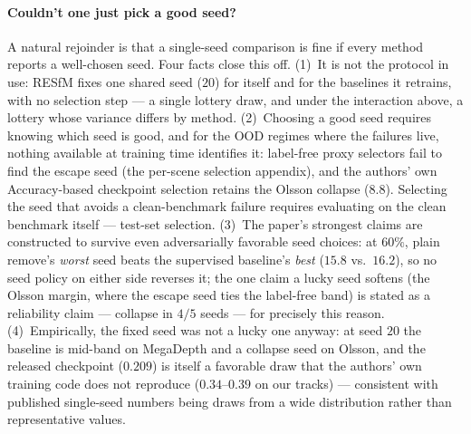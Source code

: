 \documentclass[10pt,twocolumn,letterpaper]{article}
\begin{document}
\paragraph{Couldn't one just pick a good seed?} A natural rejoinder is that a
single-seed comparison is fine if every method reports a well-chosen seed. Four facts
close this off. (1)~It is not the protocol in use: RESfM fixes one shared seed ($20$)
for itself and for the baselines it retrains, with no selection step --- a single
lottery draw, and under the interaction above, a lottery whose variance differs by
method. (2)~Choosing a good seed requires knowing which seed is good, and for the OOD
regimes where the failures live, nothing available at training time identifies it:
label-free proxy selectors fail to find the escape seed (the per-scene selection appendix), and
the authors' own Accuracy-based checkpoint selection retains the Olsson collapse
($8.8$). Selecting the seed that avoids a clean-benchmark failure requires evaluating
on the clean benchmark itself --- test-set selection. (3)~The paper's strongest claims
are constructed to survive even adversarially favorable seed choices: at $60\%$, plain
remove's \emph{worst} seed beats the supervised baseline's \emph{best} ($15.8$ vs.\
$16.2$), so no seed policy on either side reverses it; the one claim a lucky seed
softens (the Olsson margin, where the escape seed ties the label-free band) is stated
as a reliability claim --- collapse in $4/5$ seeds --- for precisely this reason.
(4)~Empirically, the fixed seed was not a lucky one anyway: at seed $20$ the baseline
is mid-band on MegaDepth and a collapse seed on Olsson, and the released checkpoint
($0.209$) is itself a favorable draw that the authors' own training code does not
reproduce ($0.34$--$0.39$ on our tracks) --- consistent with published single-seed
numbers being draws from a wide distribution rather than representative values.
\end{document}
